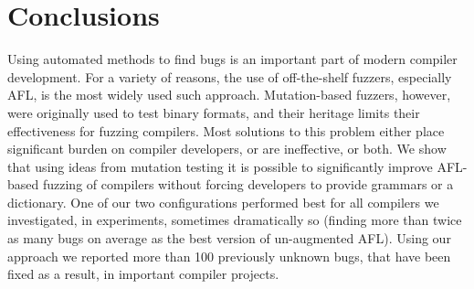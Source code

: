 \section{Conclusions}

Using automated methods to find bugs is an important part of modern
compiler development.  For a variety of reasons, the use of
off-the-shelf fuzzers, especially AFL, is the most widely used such
approach.  Mutation-based fuzzers, however, were originally used to
test binary formats, and their heritage limits their effectiveness for
fuzzing compilers.  Most solutions to this problem either place significant
burden on compiler developers, or are ineffective, or both.  We show
that using ideas from mutation testing it is possible to significantly
improve AFL-based fuzzing of compilers without forcing developers to
provide grammars or a dictionary.  One of our two configurations
performed best for all compilers we investigated, in experiments,
sometimes dramatically so (finding more than twice as many bugs on
average as the best version of un-augmented AFL).  Using our approach
we reported more than 100 previously unknown bugs, that have been
fixed as a result, in important
compiler projects.